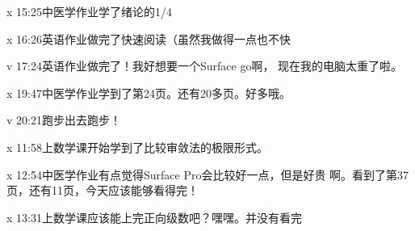 \documentclass{peterlitsdoc}
\begin{document}
\begin{pltplan}
    \item[x]{15:25}{中医学作业}{学了绪论的1/4}
    \item[x]{16:26}{英语作业}{做完了快速阅读（虽然我做得一点也不快}
    \item[v]{17:24}{英语作业}{做完了！我好想要一个Surface go啊，
        现在我的电脑太重了啦。}
    \item[x]{19:47}{中医学作业}{学到了第24页。还有20多页。好多哦。}
    \item[v]{20:21}{跑步}{出去跑步！}
    \item[x]{11:58}{上数学课}{开始学到了比较审敛法的极限形式。}
    \item[x]{12:54}{中医学作业}{有点觉得Surface Pro会比较好一点，但是好贵
        啊。看到了第37页，还有11页，今天应该能够看得完！}
    \item[x]{13:31}{上数学课}{应该能上完正向级数吧？嘿嘿。并没有看完}
\end{pltplan}
\end{document}

